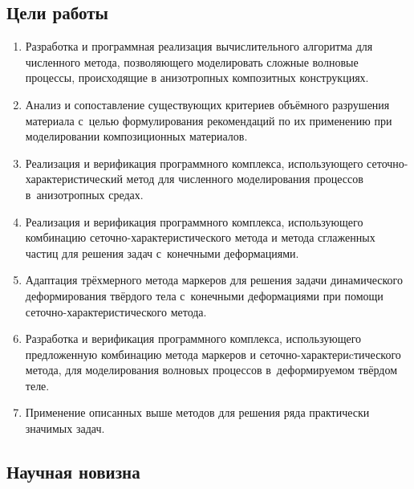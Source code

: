 \documentclass[a4paper,14pt]{extarticle}
\numberwithin{equation}{section}
\begin{document}
    \subsection*{Цели работы}

    \begin{enumerate}
        \item Разработка и программная реализация вычислительного алгоритма для численного метода, позволяющего
              моделировать сложные волновые процессы, происходящие в анизотропных композитных конструкциях.
        \item Анализ и сопоставление существующих критериев объёмного разрушения материала с~целью формулирования рекомендаций по их
              применению при моделировании композиционных материалов.
        \item Реализация и верификация программного комплекса, использующего сеточно-характеристический метод для
              численного моделирования процессов в~анизотропных средах.
        \item Реализация и верификация программного комплекса, использующего комбинацию сеточно-характеристического
              метода и метода сглаженных частиц для решения задач с~конечными деформациями.
        \item Адаптация трёхмерного метода маркеров для решения задачи динамического деформирования твёрдого
              тела с~конечными деформациями при помощи сеточно-характеристического метода.
        \item Разработка и верификация программного комплекса, использующего предложенную комбинацию метода маркеров
              и сеточно-ха\-рак\-те\-риc\-ти\-чес\-ко\-го метода, для моделирования волновых процессов в~деформируемом
              твёрдом теле.
        \item Применение описанных выше методов для решения ряда практически значимых задач.
    \end{enumerate}

    \subsection*{Научная новизна}
\end{document}
